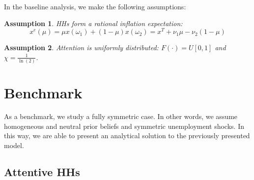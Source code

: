 \documentclass[12pt,a4paper]{article}
\newtheorem{assumption}{Assumption}
\begin{document}
In the baseline analysis, we make the following assumptions:
\begin{assumption}
    \label{Ass1}
    HHs form a rational inflation expectation:
    \begin{equation}
    \label{expectedinflation}
    x^e(\mu)=\mu x(\omega_1)+(1-\mu)x(\omega_2)=x^T+\nu_1\mu-\nu_2(1-\mu)
    \end{equation}
\end{assumption}
\begin{assumption}
\label{Ass2} 
    Attention is uniformly distributed: $F(\cdot)=U[0,1]$ and $\chi=\frac{1}{\ln(2)}$. 
\end{assumption}


\section{Benchmark}

As a benchmark, we study a fully symmetric case. In other words, we assume homogeneous and neutral prior beliefs and symmetric unemployment shocks. In this way, we are able to present an analytical solution to the previously presented model.

\subsection{Attentive HHs}
\end{document}
